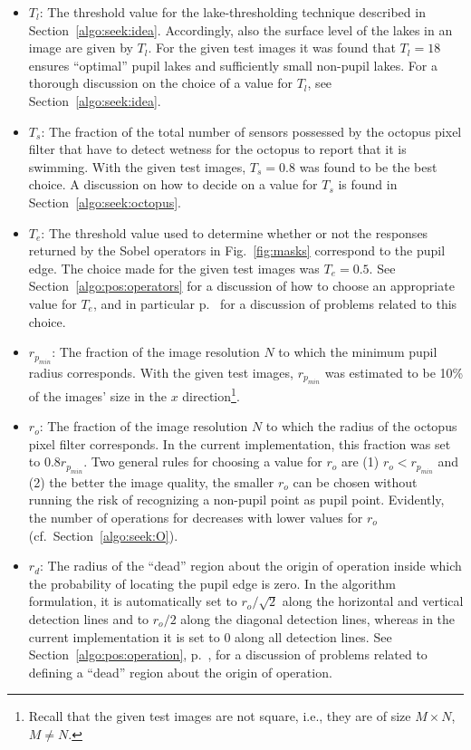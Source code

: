 \begin{itemize}
\item $T_{l}$: The threshold value for the lake-thresholding technique
  described in Section~\ref{algo:seek:idea}.  Accordingly, also the
  surface level of the lakes in an image are given by $T_{l}$.  For
  the given test images it was found that $T_{l}=18$ ensures
  ``optimal'' pupil lakes and sufficiently small non-pupil lakes.  For
  a thorough discussion on the choice of a value for $T_{l}$, see
  Section~\ref{algo:seek:idea}.
\item $T_{s}$: The fraction of the total number of sensors possessed
  by the octopus pixel filter that have to detect wetness for the
  octopus to report that it is swimming.  With the given test images,
  $T_{s}=0.8$ was found to be the best choice.  A discussion on how to
  decide on a value for $T_{s}$ is found in
  Section~\ref{algo:seek:octopus}.
\item $T_{e}$: The threshold value used to determine whether or not
  the responses returned by the Sobel operators in
  Fig.~\ref{fig:masks} correspond to the pupil edge.  The choice made
  for the given test images was $T_{e}=0.5$.  See
  Section~\ref{algo:pos:operators} for a discussion of how to choose
  an appropriate value for $T_{e}$, and in particular
  p.~\pageref{pg:TEproblems} for a discussion of problems related to
  this choice.
\item $r_{p_{min}}$: The fraction of the image resolution $N$ to which
  the minimum pupil radius corresponds.  With the given test images,
  $r_{p_{min}}$ was estimated to be 10\% of the images' size in the
  $x$ direction\footnote{Recall that the given test images are not
    square, i.e., they are of size $M\times N$, $M\neq N$.}.
\item $r_{o}$: The fraction of the image resolution $N$ to which the
  radius of the octopus pixel filter corresponds.  In the current
  implementation, this fraction was set to $0.8r_{p_{min}}$.  Two
  general rules for choosing a value for $r_{o}$ are (1)
  $r_{o}<r_{p_{min}}$ and (2) the better the image quality, the
  smaller $r_{o}$ can be chosen without running the risk of
  recognizing a non-pupil point as pupil point.  Evidently, the number
  of operations for {\octopus} decreases with lower values for $r_{o}$
  (cf.\ Section~\ref{algo:seek:O}).
\item $r_{d}$: The radius of the ``dead'' region about the origin of
  operation inside which the probability of locating the pupil edge is
  zero.  In the algorithm formulation, it is automatically set to
  $r_{o}/\sqrt{2}$ along the horizontal and vertical detection lines
  and to $r_{o}/2$ along the diagonal detection lines, whereas in the
  current implementation it is set to 0 along all detection lines.
  See Section~\ref{algo:pos:operation}, p.~\pageref{pg:dead}, for a
  discussion of problems related to defining a ``dead'' region about
  the origin of operation.
\end{itemize}

